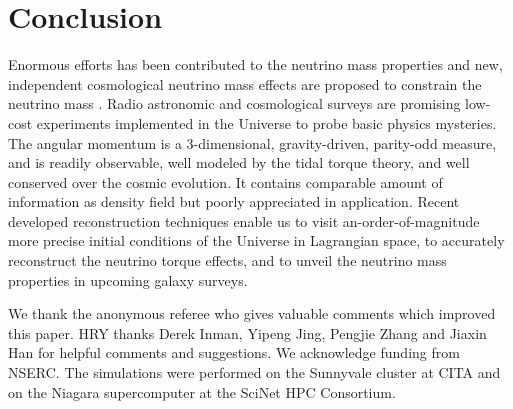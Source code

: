 \documentclass[aps,prd,twocolumn,amsmath,amssymb,amsfont,superscriptaddress,nofootinbib]{revtex4-1}
\begin{document}
\section{Conclusion}\label{sec.conclusion}
Enormous efforts has been contributed to the neutrino mass properties and new, independent cosmological neutrino mass effects are proposed to constrain the neutrino mass \citep{2014PhRvL.113m1301Z,2016PhRvL.116n1301Z,2017NatAs...1E.143Y,2017PhRvD..95h3518I,2019PhRvL.122d1302C}.
Radio astronomic and cosmological surveys are promising low-cost experiments implemented in the Universe to probe basic physics mysteries. 
The angular momentum is a 3-dimensional, gravity-driven, parity-odd measure, 
and is readily observable, well modeled by the tidal torque theory, and well conserved over the cosmic evolution.
It contains comparable amount of information as density field but poorly appreciated in application.
Recent developed reconstruction techniques enable us to visit an-order-of-magnitude more precise initial conditions of the Universe in Lagrangian space, 
to accurately reconstruct the neutrino torque effects,
and to unveil the neutrino mass properties in upcoming galaxy surveys.

\acknowledgments
We thank the anonymous referee who gives valuable comments which improved this paper.
HRY thanks Derek Inman, Yipeng Jing, Pengjie Zhang and Jiaxin Han for helpful comments and suggestions.
We acknowledge funding from NSERC.
The simulations were performed on the Sunnyvale cluster at CITA and on the Niagara supercomputer at the SciNet HPC Consortium.

\end{document}
